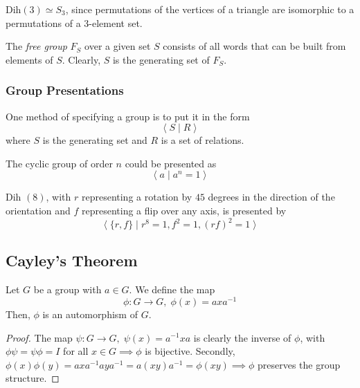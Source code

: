 \documentclass{article}
\begin{document}
    \begin{example}
      Dih$(3) \simeq S_{3}$, since permutations of the vertices of a triangle are isomorphic to a permutations of a 3-element set. 
    \end{example}

    \begin{definition}
      The \textit{free group} $F_{S}$ over a given set $S$ consists of all words that can be built from elements of $S$. Clearly, $S$ is the generating set of $F_{S}$. 
    \end{definition}

  \subsubsection{Group Presentations}

    One method of specifying a group is to put it in the form
    \begin{equation}
      \big\langle \; S \; | \; R \;\big\rangle
    \end{equation}
    where $S$ is the generating set and $R$ is a set of relations. 

    \begin{example}
      The cyclic group of order $n$ could be presented as
      \[ \big\langle \; a \; | \; a^{n} = 1 \;\big\rangle \]
    \end{example}

    \begin{example}
      Dih $(8)$, with $r$ representing a rotation by $45$ degrees in the direction of the orientation and $f$ representing a flip over any axis, is presented by
      \[ \big\langle \; \{ r, f\} \; | \; r^{8} = 1, f^{2} = 1, (r f)^{2} = 1 \;\big\rangle \]
    \end{example}

\subsection{Cayley's Theorem}

  \begin{lemma}
    Let $G$ be a group with $a \in G$. We define the map
    \[ \phi: G \longrightarrow G, \; \phi (x) = a x a^{-1}\]
    Then, $\phi$ is an automorphism of $G$. 
  \end{lemma}
  \begin{proof}
    The map $\psi: G \longrightarrow G, \; \psi(x) = a^{-1} x a$ is clearly the inverse of $\phi$, with $\phi \psi = \psi \phi = I$ for all $x \in G \implies \phi$ is bijective. Secondly, $\phi(x) \phi(y) = a x a^{-1} a y a^{-1} = a (x y) a ^{-1} = \phi (x y) \implies \phi$ preserves the group structure. 
  \end{proof}
\end{document}
